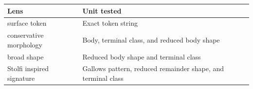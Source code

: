 {\small
\begin{tabular}{ll}
\toprule
Lens & Unit tested \\
\midrule
surface token & Exact token string \\
conservative morphology & Body, terminal class, and reduced body shape \\
broad shape & Reduced body shape and terminal class \\
Stolfi inspired signature & Gallows pattern, reduced remainder shape, and terminal class \\
\bottomrule
\end{tabular}
}
